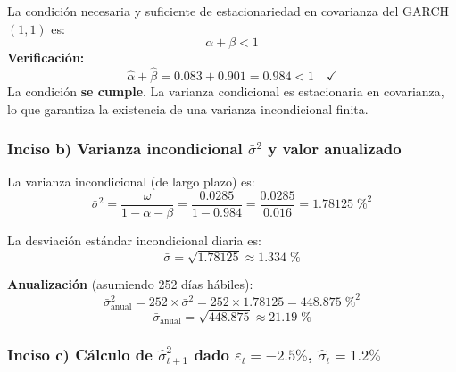 \documentclass[12pt,a4paper]{article}
\begin{document}
\begin{solucion}
La condición necesaria y suficiente de estacionariedad en covarianza del GARCH$(1,1)$ es:
\begin{equation}
\alpha + \beta < 1
\end{equation}
\textbf{Verificación:}
\begin{equation}
\hat{\alpha}+\hat{\beta} = 0.083 + 0.901 = 0.984 < 1 \quad \checkmark
\end{equation}
La condición \textbf{se cumple}. La varianza condicional es estacionaria en covarianza, lo que garantiza la existencia de una varianza incondicional finita.
\end{solucion}

\subsubsection*{Inciso b) Varianza incondicional $\bar{\sigma}^2$ y valor anualizado}

\begin{solucion}
La varianza incondicional (de largo plazo) es:
\begin{equation}
\bar{\sigma}^2 = \frac{\omega}{1-\alpha-\beta} = \frac{0.0285}{1-0.984} = \frac{0.0285}{0.016} = 1.78125 \;\%^2
\end{equation}

La desviación estándar incondicional diaria es:
\begin{equation}
\bar{\sigma} = \sqrt{1.78125} \approx 1.334\;\%
\end{equation}

\textbf{Anualización} (asumiendo 252 días hábiles):
\begin{equation}
\bar{\sigma}^2_{\text{anual}} = 252 \times \bar{\sigma}^2 = 252 \times 1.78125 = 448.875 \;\%^2
\end{equation}
\begin{equation}
\boxed{\bar{\sigma}_{\text{anual}} = \sqrt{448.875} \approx 21.19\;\%}
\end{equation}
\end{solucion}

\subsubsection*{Inciso c) Cálculo de $\hat{\sigma}_{t+1}^2$ dado $\varepsilon_t=-2.5\%$, $\hat{\sigma}_t=1.2\%$}
\end{document}

